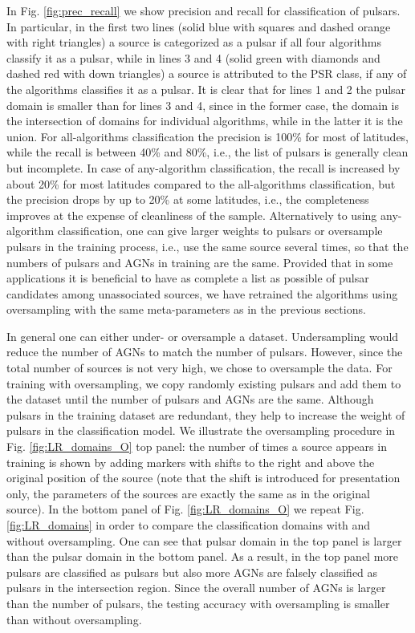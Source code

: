 In Fig. \ref{fig:prec_recall} we show precision and recall for classification of pulsars.
In particular, in the first two lines (solid blue with squares and dashed orange with right triangles) a source is categorized as a pulsar if all four algorithms classify it as a pulsar,
while in lines 3 and 4 (solid green with diamonds and dashed red with down triangles) a source is attributed to the PSR class, if any of the algorithms classifies it as a pulsar.
It is clear that for lines 1 and 2 the pulsar domain is smaller than for lines 3 and 4, since in the former case, the domain is the intersection of domains for individual algorithms, while in the latter it is the union.
For all-algorithms classification the precision is 100\% for most of latitudes, while the recall is between 40\% and 80\%, i.e., the list of pulsars is generally clean but incomplete.
In case of any-algorithm classification, the recall is increased by about 20\% for most latitudes compared to the all-algorithms classification, but the precision drops by up to 20\% at some latitudes, i.e., the completeness improves at the expense of cleanliness of the sample.
Alternatively to using any-algorithm classification, one can give larger weights to pulsars or oversample pulsars in the training process, i.e., use the same source several times, so that the numbers of pulsars and AGNs in training are the same.
Provided that in some applications it is beneficial to have as complete a list as possible of pulsar candidates among unassociated sources, we have retrained the algorithms using oversampling with the same meta-parameters as in the previous sections.

In general one can either under- or oversample a dataset. Undersampling would reduce the number of AGNs to match the number of pulsars. However, since the total number of sources is not very high, we chose to oversample the data. 
For training with oversampling, we copy randomly existing pulsars and add them to the dataset until the number of pulsars and AGNs are the same.
Although pulsars in the training dataset are redundant, they help to increase the weight of pulsars in the classification model.
We illustrate the oversampling procedure in Fig. \ref{fig:LR_domains_O} top panel:
the number of times a source appears in training is shown by adding markers with shifts to the right and above the original position of the source (note that the shift is introduced for presentation only, the parameters of the sources are exactly the same as in the original source).
In the bottom panel of Fig. \ref{fig:LR_domains_O} we repeat Fig.  \ref{fig:LR_domains} in order to compare the classification domains with and without oversampling.
One can see that pulsar domain in the top panel is larger than the pulsar domain in the bottom panel.
As a result, in the top panel more pulsars are classified as pulsars but also more AGNs are falsely classified as pulsars in the intersection region. 
Since the overall number of AGNs is larger than the number of pulsars, the testing accuracy with oversampling is smaller than without oversampling.


